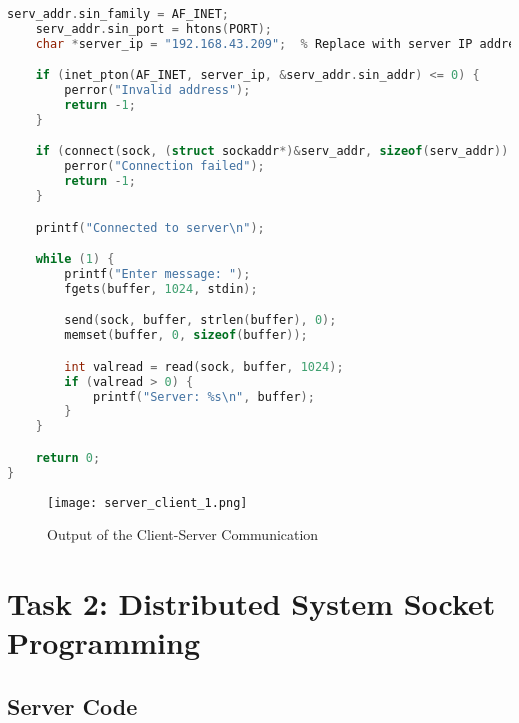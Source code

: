 \documentclass[12pt]{article}
\begin{document}
\begin{lstlisting}[language=C, caption={Server Code for Client-Server Communication}]
    serv_addr.sin_family = AF_INET;
    serv_addr.sin_port = htons(PORT);
    char *server_ip = "192.168.43.209";  % Replace with server IP address

    if (inet_pton(AF_INET, server_ip, &serv_addr.sin_addr) <= 0) {
        perror("Invalid address");
        return -1;
    }

    if (connect(sock, (struct sockaddr*)&serv_addr, sizeof(serv_addr)) < 0) {
        perror("Connection failed");
        return -1;
    }

    printf("Connected to server\n");

    while (1) {
        printf("Enter message: ");
        fgets(buffer, 1024, stdin);

        send(sock, buffer, strlen(buffer), 0);
        memset(buffer, 0, sizeof(buffer));

        int valread = read(sock, buffer, 1024);
        if (valread > 0) {
            printf("Server: %s\n", buffer);
        }
    }

    return 0;
}
\end{lstlisting}

\begin{figure}[h!]
    \centering
    \texttt{[image: server\_client\_1.png]}
    \caption{Output of the Client-Server Communication}
    \label{fig:server_output}
\end{figure}

\section{Task 2: Distributed System Socket Programming}

\subsection{Server Code}
\end{document}
